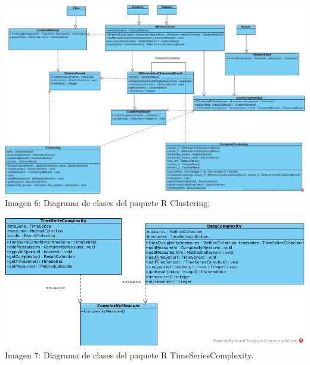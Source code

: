 \documentclass[14pt]{extarticle}
\theoremstyle{definition}
\theoremstyle{remark}
\begin{document}
\begin{landscape}
	\begin{center}
	\includegraphics[scale=0.4]{ClusteringR.jpg}
	\\Imagen 6: Diagrama de clases del paquete R Clustering.
	\end{center}
\end{landscape}

\begin{landscape}
	\begin{center}
	\includegraphics[scale=0.5]{ComplexityR.jpg}
	\\Imagen 7: Diagrama de clases del paquete R TimeSeriesComplexity.
	\end{center}
\end{landscape}
\end{document}
